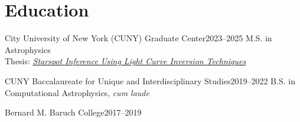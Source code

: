 \section{Education}

\begin{jobshort}{City University of New York (CUNY) Graduate Center}{2023--2025}
M.S. in Astrophysics\\
Thesis:
\href{https://academicworks.cuny.edu/gc_etds/6480/}
{\emph{Starspot Inference Using Light Curve Inversion Techniques}}
\end{jobshort}

\vspace{0.4em}

\begin{jobshort}{CUNY Baccalaureate for Unique and Interdisciplinary Studies}{2019--2022}
B.S. in Computational Astrophysics, \emph{cum laude}
\end{jobshort}

\vspace{0.4em}

\begin{jobshort}{Bernard M. Baruch College}{2017--2019}
\end{jobshort}